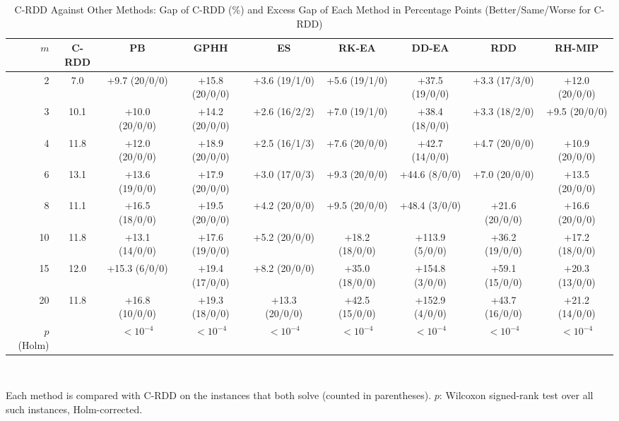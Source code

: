 \begin{table}[t]
  \centering
  \caption{C-RDD Against Other Methods: Gap of C-RDD (\%) and Excess Gap of Each Method in Percentage Points (Better/Same/Worse for C-RDD)}
  \label{tab:compare}
  \footnotesize
  \setlength{\tabcolsep}{3pt}
  \begin{tabular}{@{}rcccccccc@{}}
    \toprule
    $m$ & C-RDD & PB & GPHH & ES & RK-EA & DD-EA & RDD & RH-MIP \\
    \midrule
2 & 7.0 & +9.7 (20/0/0) & +15.8 (20/0/0) & +3.6 (19/1/0) & +5.6 (19/1/0) & +37.5 (19/0/0) & +3.3 (17/3/0) & +12.0 (20/0/0) \\
3 & 10.1 & +10.0 (20/0/0) & +14.2 (20/0/0) & +2.6 (16/2/2) & +7.0 (19/1/0) & +38.4 (18/0/0) & +3.3 (18/2/0) & +9.5 (20/0/0) \\
4 & 11.8 & +12.0 (20/0/0) & +18.9 (20/0/0) & +2.5 (16/1/3) & +7.6 (20/0/0) & +42.7 (14/0/0) & +4.7 (20/0/0) & +10.9 (20/0/0) \\
6 & 13.1 & +13.6 (19/0/0) & +17.9 (20/0/0) & +3.0 (17/0/3) & +9.3 (20/0/0) & +44.6 (8/0/0) & +7.0 (20/0/0) & +13.5 (20/0/0) \\
8 & 11.1 & +16.5 (18/0/0) & +19.5 (20/0/0) & +4.2 (20/0/0) & +9.5 (20/0/0) & +48.4 (3/0/0) & +21.6 (20/0/0) & +16.6 (20/0/0) \\
10 & 11.8 & +13.1 (14/0/0) & +17.6 (19/0/0) & +5.2 (20/0/0) & +18.2 (18/0/0) & +113.9 (5/0/0) & +36.2 (19/0/0) & +17.2 (18/0/0) \\
15 & 12.0 & +15.3 (6/0/0) & +19.4 (17/0/0) & +8.2 (20/0/0) & +35.0 (18/0/0) & +154.8 (3/0/0) & +59.1 (15/0/0) & +20.3 (13/0/0) \\
20 & 11.8 & +16.8 (10/0/0) & +19.3 (18/0/0) & +13.3 (20/0/0) & +42.5 (15/0/0) & +152.9 (4/0/0) & +43.7 (16/0/0) & +21.2 (14/0/0) \\
\midrule
$p$ (Holm) & & $<10^{-4}$ & $<10^{-4}$ & $<10^{-4}$ & $<10^{-4}$ & $<10^{-4}$ & $<10^{-4}$ & $<10^{-4}$ \\
    \bottomrule
  \end{tabular}
  \\[2pt]
  \parbox{\textwidth}{\scriptsize Each method is compared with C-RDD on the instances that both solve (counted in parentheses). $p$: Wilcoxon signed-rank test over all such instances, Holm-corrected.}
\end{table}

